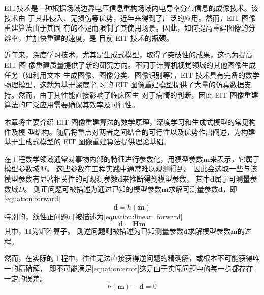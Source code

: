 

EIT技术是一种根据场域边界电压信息重构场域内电导率分布信息的成像技术。该技术由
于其非侵入、无损伤等优势，近年来得到了广泛的应用。然而，EIT 图像重建算法由于其固
有的不足而限制了其使用场景。因此，如何提高重建图像的分辨率，并加快重建的速度，是
目前 EIT 技术的瓶颈。

近年来，深度学习技术，尤其是生成式模型，取得了突破性的成果，这也为提高 EIT 图
像重建质量提供了新的研究方向。不同于计算机视觉领域的其他图像生成任务（如利用文本
生成图像、图像分类、图像识别等），EIT 技术具有完备的数学物理模型，这就为基于深度学
习的 EIT 图像重建模型提供了大量的仿真数据支持。然而，由于其性能直接影响了临床医生
对于病情的判断，因此 EIT 图像重建算法的广泛应用需要确保其效率及可行性。

本章将主要介绍 EIT 图像重建算法的数学原理，深度学习和生成式模型的常见构件及模
型结构。随后将重点对两者之间结合的可行性以及优势作出阐述，为构建基于生成式模型的
EIT 图像重建算法提供理论基础。

\label{PrincipleEIT}
在工程数学领域通常对事物内部的特征进行参数化，用模型参数$\boldsymbol{m}$来表示，它属于模型参数域$M$。
这些参数在工程实践中通常难以观测得到。
因此会选取一些与该模型参数有显著相关性的可观测参数$\boldsymbol{d}$来推断得到模型参数，
其中$\boldsymbol{d}$属于可测量参数域$D$。
则正问题可被描述为通过已知的模型参数$\boldsymbol{m}$求解可测量参数$\boldsymbol{d}$，即\cref{equation:forward}
\begin{equation}
  \label{equation:forward}
  \boldsymbol{d} = h(\boldsymbol{m})
\end{equation}
特别的，线性正问题可被描述为\cref{equation:linear_forward}
\begin{equation}
  \label{equation:linear_forward}
  \boldsymbol{d} = \boldsymbol{H}\boldsymbol{m}
\end{equation}
其中，$\boldsymbol{H}$为矩阵算子。
则逆问题则被描述为已知测量参数$\boldsymbol{d}$求解模型参数$\boldsymbol{m}$的过程。

然而，在实际的工程中，往往无法直接获得逆问题的精确解，或根本不可能获得唯一的精确解，
即不可能满足\cref{equation:error}这是由于实际问题中的每一步都存在一定的误差。
\begin{equation}
  \label{equation:error}
  h(\boldsymbol{m}) - \boldsymbol{d} = 0
\end{equation}

